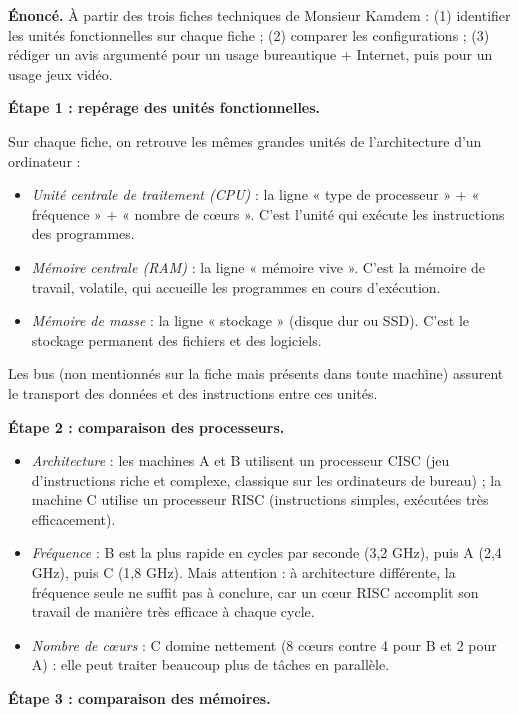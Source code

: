 \documentclass[11pt]{article}
\begin{document}
\begin{exoresolu}
\textbf{Énoncé.} À partir des trois fiches techniques de Monsieur Kamdem : (1) identifier les unités fonctionnelles sur chaque fiche ; (2) comparer les configurations ; (3) rédiger un avis argumenté pour un usage bureautique + Internet, puis pour un usage jeux vidéo.

\tcblower

\textbf{Étape 1 : repérage des unités fonctionnelles.}

Sur chaque fiche, on retrouve les mêmes grandes unités de l'architecture d'un ordinateur :
\begin{itemize}
\item \emph{Unité centrale de traitement (CPU)} : la ligne « type de processeur » + « fréquence » + « nombre de cœurs ». C'est l'unité qui exécute les instructions des programmes.
\item \emph{Mémoire centrale (RAM)} : la ligne « mémoire vive ». C'est la mémoire de travail, volatile, qui accueille les programmes en cours d'exécution.
\item \emph{Mémoire de masse} : la ligne « stockage » (disque dur ou SSD). C'est le stockage permanent des fichiers et des logiciels.
\end{itemize}
Les bus (non mentionnés sur la fiche mais présents dans toute machine) assurent le transport des données et des instructions entre ces unités.

\textbf{Étape 2 : comparaison des processeurs.}

\begin{itemize}
\item \emph{Architecture} : les machines A et B utilisent un processeur CISC (jeu d'instructions riche et complexe, classique sur les ordinateurs de bureau) ; la machine C utilise un processeur RISC (instructions simples, exécutées très efficacement).
\item \emph{Fréquence} : B est la plus rapide en cycles par seconde (3,2 GHz), puis A (2,4 GHz), puis C (1,8 GHz). Mais attention : à architecture différente, la fréquence seule ne suffit pas à conclure, car un cœur RISC accomplit son travail de manière très efficace à chaque cycle.
\item \emph{Nombre de cœurs} : C domine nettement (8 cœurs contre 4 pour B et 2 pour A) : elle peut traiter beaucoup plus de tâches en parallèle.
\end{itemize}

\textbf{Étape 3 : comparaison des mémoires.}


\end{exoresolu}
\end{document}
